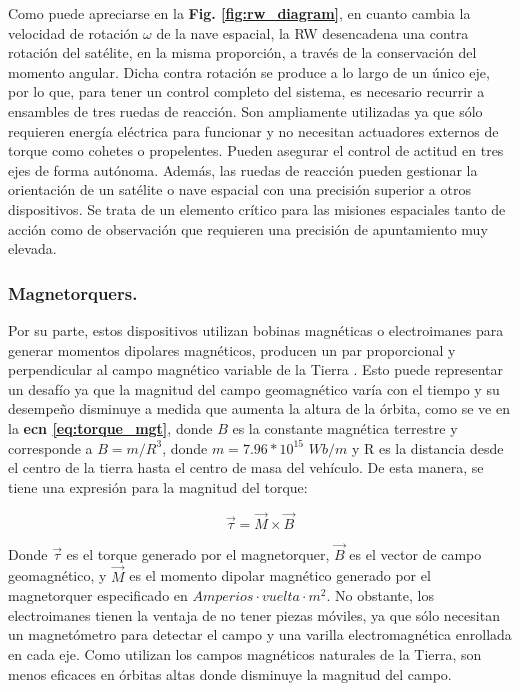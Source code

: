 Como puede apreciarse en la \textbf{Fig. \ref{fig:rw_diagram}}, en cuanto cambia la velocidad de rotación $\omega$ de la nave espacial, la RW desencadena una contra rotación del satélite, en la misma proporción, a través de la conservación del momento angular. Dicha contra rotación se produce a lo largo de un único eje, por lo que, para tener un control completo del sistema, es necesario recurrir a ensambles de tres ruedas de reacción.
Son ampliamente utilizadas ya que sólo requieren energía eléctrica para funcionar y no necesitan actuadores externos de torque como cohetes o propelentes. Pueden asegurar el control de actitud en tres ejes de forma autónoma. Además, las ruedas de reacción pueden gestionar la orientación de un satélite o nave espacial con una precisión superior a otros dispositivos. Se trata de un elemento crítico para las misiones espaciales tanto de acción como de observación que requieren una precisión de apuntamiento muy elevada.

\subsubsection{Magnetorquers.}

Por su parte, estos dispositivos utilizan bobinas magnéticas o electroimanes para generar momentos dipolares magnéticos, producen un par proporcional y perpendicular al campo magnético variable de la Tierra \cite{Rycroft1997}. Esto puede representar un desafío ya que la magnitud del campo geomagnético varía con el tiempo y su desempeño disminuye a medida que aumenta la altura de la órbita, como se ve en la \textbf{ecn \eqref{eq:torque_mgt}}, donde $B$ es la constante magnética terrestre y corresponde a $B=m/R^3$, donde $m = 7.96*10^{15}$    $Wb/m$   y R es la distancia desde el centro de la tierra hasta el centro de masa del vehículo. De esta manera, se tiene una expresión para la magnitud del torque: 

\begin{equation}\label{eq:torque_mgt}
	\vec{\tau} = \vec{M}\times\vec{B}	
\end{equation}


Donde $\vec{\tau}$ es el torque generado por el magnetorquer, $\vec{B}$ es el vector de campo geomagnético, y $\vec{M}$ es el momento dipolar magnético generado por el magnetorquer especificado en $Amperios\cdot vuelta\cdot m^2$. No obstante, los electroimanes tienen la ventaja de no tener piezas móviles, ya que sólo necesitan un magnetómetro para detectar el campo y una varilla electromagnética enrollada en cada eje. Como utilizan los campos magnéticos naturales de la Tierra, son menos eficaces en órbitas altas donde disminuye la magnitud del campo.

